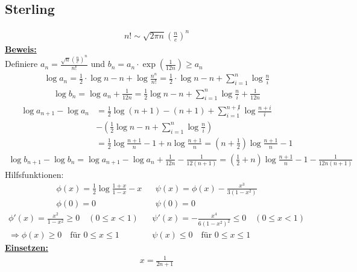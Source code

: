\subsection{Sterling}
\begin{align*}
    n! \sim \sqrt{2\pi n} (\frac{n}{e})^n
\end{align*}
\underline{\textbf{Beweis:}}\\
Definiere $a_n = \frac{\sqrt{n}\left(\frac{n}{e}\right)^n}{n!}$ und $b_n = a_n \cdot \exp(\frac{1}{12n}) \geq a_n$
\begin{align*}
    \log a_n = \frac{1}{2} \cdot \log n - n + \log \frac{n^n}{n!} = \frac{1}{2} \cdot \log n - n + \sum_{i = 1}^n \log \frac{n}{i}
\end{align*}
\begin{align*}
    \log b_n = \log a_n + \frac{1}{12n} = \frac{1}{2} \log n - n + \sum_{i = 1}^n \log \frac{n}{i} + \frac{1}{12n}
\end{align*}
\begin{align*}
    \log a_{n+1} - \log a_n &= \frac{1}{2} \log (n+1) - (n+1) + \sum_{i =1}^{n+\not1} \log \frac{n+i}{i}\\
    &-\left( \frac{1}{2} \log n - n + \sum_{i = 1}^{n} \log \frac{n}{i}\right)\\
    &= \frac{1}{2} \log \frac{n+1}{n} - 1 + n \log \frac{n+1}{n} = \left(n + \frac{1}{2}\right) \log \frac{n+1}{n} - 1
\end{align*}
\begin{align*}
    \log b_{n+1} - \log b_n = \log a_{n+1} - \log a_n + \frac{1}{12n} - \frac{1}{12(n+1)} = \left( \frac{1}{2} + n\right) \log \frac{n+1}{n} - 1 - \frac{1}{12n(n+1)}
\end{align*}
Hilfsfunktionen:
\begin{align*}
    \phi(x) = \frac{1}{2} \log \frac{1+x}{1-x} - x && \psi(x) = \phi(x) - \frac{x^3}{3(1-x^2)}\\
    \phi(0) = 0 && \psi(0) = 0
\end{align*}
\begin{align*}
    \phi'(x) = \frac{x^2}{1 - x^2} \geq 0 \quad (0 \leq x < 1) && \psi'(x) = - \frac{x^4}{6(1-x^2)^2} \leq 0 \quad (0 \leq x < 1)\\
    \Rightarrow \phi(x) \geq 0 \quad \text{für } 0 \leq x \leq 1 && \psi(x) \leq 0 \quad \text{für } 0 \leq x \leq 1
\end{align*}
\underline{\textbf{Einsetzen:}}
\newcommand{\einsdurchzweinpluseins}{\frac{1}{2n+1}}
\begin{align*}
    x = \frac{1}{2n+1}
\end{align*}



